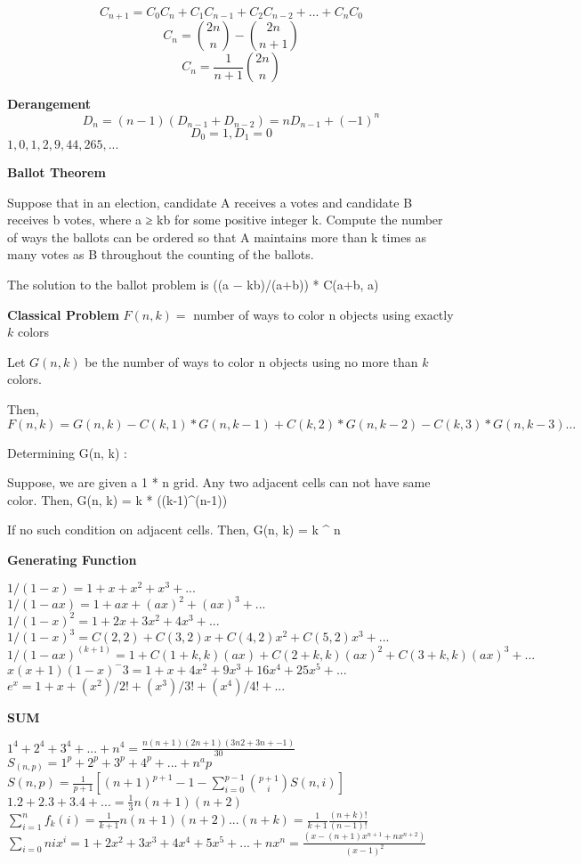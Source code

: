 \[ C_{n+1}= C_0C_n+C_1C_{n-1}+C_2C_{n-2}+... +C_nC_0 \]
\[ C_n = \binom{2n}{n} - \binom{2n}{n+1} \]
\[ C_n = \frac{1}{n + 1} \binom{2n}{n} \]

\textbf{Derangement}
\[ D_n = (n-1) (D_{n-1} + D_{n-2}) = nD_{n-1} + (-1)^n \]
\[ D_0 = 1, D_1 = 0 \]  
$ 1, 0, 1, 2, 9, 44, 265, ... $

\textbf{Ballot Theorem}

Suppose that in an election, candidate A receives
a votes and candidate B receives b votes, where a ≥ kb for some positive
integer k. Compute the number of ways the ballots can be ordered so that
A maintains more than k times as many votes as B throughout the counting
of the ballots.

The solution to the ballot problem is ((a − kb)/(a+b)) * C(a+b, a)

\textbf{Classical Problem}
$ F(n, k) = $ number of ways to color n objects using exactly $ k $ colors

Let $ G(n, k) $ be the number of ways to color n objects using no more than $ k $ colors.

Then, $ F(n, k) = G(n, k) - C(k, 1) * G(n, k-1) + C(k, 2) * G(n, k-2) - C(k, 3) * G(n, k-3) ... $

Determining G(n, k) :

Suppose, we are given a 1 * n grid. Any two adjacent cells can not have same color.
Then, G(n, k) = k * ((k-1)^(n-1))

If no such condition on adjacent cells.
Then, G(n, k) = k ^ n


\textbf{Generating Function}

$ 1/(1 - x) = 1 + x + x^2 + x^3 + ... $
$ 1/(1 - ax) = 1 + ax + (ax)^2 + (ax)^3 + ... $
$ 1/(1 - x)^2 = 1 + 2x + 3x^2 + 4x^3 + ... $
$ 1/(1 - x)^3 = C(2, 2) + C(3, 2)x + C(4, 2)x^2 + C(5, 2)x^3 + ... $
$ 1/(1 - ax)^(k + 1) = 1 + C(1 + k, k)(ax) + C(2 + k, k)(ax)^2 + C(3 + k, k)(ax)^3 + ... $
$ x(x + 1)(1 - x)^-3 = 1 + x + 4x^2 + 9x^3 + 16x^4 + 25x^5 + ... $
$ e^x = 1 + x + (x^2)/2! + (x^3)/3! + (x^4)/4! + ... $

\textbf{SUM}

\( 1^4+2^4+3^4+...+n^4=\frac{n(n+1)(2n+1)(3n2+3n+-1)}{30} \) \\
\( S_{(n, p)} = 1^p + 2^p + 3^p + 4^p + ... + n^ap \) \\
\( S(n, p) = \frac{1}{p + 1} [(n + 1)^{p + 1} - 1 - \sum_{i = 0}^{p - 1} \binom{p + 1}{i} S(n, i)] \) \\
\( 1.2 + 2.3 + 3.4 + ... = \frac{1}{3} n(n+1)(n+2) \) \\
\( \sum_{i=1}^n f_k(i) = \frac{1}{k+1} n(n+1)(n+2)...(n+k) = \frac{1}{k+1}\frac{(n+k)!}{(n-1)!} \) \\
\( \sum_{i=0}{n}ix^i = 1 + 2x^2 + 3x^3 + 4x^4 + 5x^5+ ... +nx^n = \frac{(x-(n+1)x^{n+1}+nx^{n+2})} {(x-1)^2} \) \\

